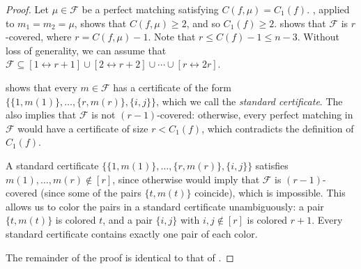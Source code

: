 \documentclass[10pt,a4paper]{article}
\theoremstyle{definition}
\providecommand{\dcoset}[2]{[#1 \leftrightarrow #2]}
\begin{document}
\begin{proof}
Let $\mu \in \mathcal{F}$ be a perfect matching satisfying $C(f,\mu) = C_1(f)$. , applied to $m_1 = m_2 = \mu$, shows that $C(f,\mu) \geq 2$, and so $C_1(f) \geq 2$.  shows that $\mathcal{F}$ is $r$-covered, where $r = C(f,\mu) - 1$. Note that $r \leq C(f) - 1 \leq n - 3$. Without loss of generality, we can assume that $\mathcal{F} \subseteq \dcoset{1}{r+1} \cup \dcoset{2}{r+2} \cup \cdots \cup \dcoset{r}{2r}$.

 shows that every $m \in \mathcal{F}$ has a certificate of the form $\bigl\{\{1,m(1)\},\ldots,\{r,m(r)\},\{i,j\}\bigr\}$, which we call the \emph{standard certificate}. The  also implies that $\mathcal{F}$ is not $(r-1)$-covered: otherwise, every perfect matching in $\mathcal{F}$ would have a certificate of size $r < C_1(f)$, which contradicts the definition of $C_1(f)$.

A standard certificate $\bigl\{\{1,m(1)\},\ldots,\{r,m(r)\},\{i,j\}\bigr\}$ satisfies $m(1),\ldots,m(r) \notin [r]$, since otherwise  would imply that $\mathcal{F}$ is $(r-1)$-covered (since some of the pairs $\{t,m(t)\}$ coincide), which is impossible. This allows us to color the pairs in a standard certificate unambiguously: a pair $\{t,m(t)\}$ is colored $t$, and a pair $\{i,j\}$ with $i,j \notin [r]$ is colored $r+1$. Every standard certificate contains exactly one pair of each color.

The remainder of the proof is identical to that of .
\end{proof}
\end{document}
